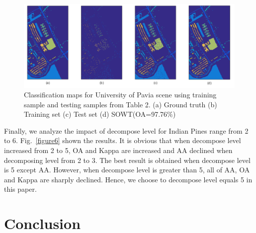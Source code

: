 \documentclass{ws-ijwmip}
\begin{document}
\begin{figure}[bh]
\centerline{\includegraphics[width=12cm]{image/paviaMap}}
\vspace*{8pt}
\caption{Classification maps for University of Pavia scene using training sample and testing samples from Table 2. (a) Ground truth (b) Training set (c) Test set (d) SOWT(OA=97.76\%)}
\label{figure8}
\end{figure}





Finally, we analyze the impact of decompose level for Indian Pines range from 2 to 6. Fig.~\ref{figure6} shown the results. It is obvious that when decompose level increased from 2 to 5, OA and Kappa are increased and AA declined when decomposing level from 2 to 3. The best result is obtained when decompose level is 5 except AA. However, when decompose level is greater than 5, all of AA, OA and Kappa are sharply declined. Hence, we choose to decompose level equals 5 in this paper.




%
%




\section{Conclusion}\label{sec:conclude}
\end{document}
